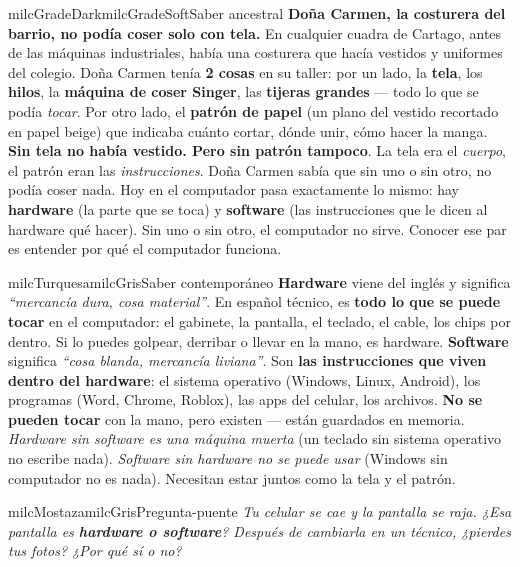 \documentclass[11pt,letterpaper]{article}
\begin{document}
\begin{softbox}{milcGradeDark}{milcGradeSoft}{Saber ancestral}
\textbf{Doña Carmen, la costurera del barrio, no podía coser solo con tela.} En cualquier cuadra de Cartago, antes de las máquinas industriales, había una costurera que hacía vestidos y uniformes del colegio. Doña Carmen tenía \textbf{2 cosas} en su taller: por un lado, la \textbf{tela}, los \textbf{hilos}, la \textbf{máquina de coser Singer}, las \textbf{tijeras grandes} --- todo lo que se podía \emph{tocar}. Por otro lado, el \textbf{patrón de papel} (un plano del vestido recortado en papel beige) que indicaba cuánto cortar, dónde unir, cómo hacer la manga. \textbf{Sin tela no había vestido. Pero sin patrón tampoco}. La tela era el \emph{cuerpo}, el patrón eran las \emph{instrucciones}. Doña Carmen sabía que sin uno o sin otro, no podía coser nada. Hoy en el computador pasa exactamente lo mismo: hay \textbf{hardware} (la parte que se toca) y \textbf{software} (las instrucciones que le dicen al hardware qué hacer). Sin uno o sin otro, el computador no sirve. Conocer ese par es entender por qué el computador funciona.
\end{softbox}

\begin{softbox}{milcTurquesa}{milcGris}{Saber contemporáneo}
\textbf{Hardware} viene del inglés y significa \emph{``mercancía dura, cosa material''}. En español técnico, es \textbf{todo lo que se puede tocar} en el computador: el gabinete, la pantalla, el teclado, el cable, los chips por dentro. Si lo puedes golpear, derribar o llevar en la mano, es hardware. \textbf{Software} significa \emph{``cosa blanda, mercancía liviana''}. Son \textbf{las instrucciones que viven dentro del hardware}: el sistema operativo (Windows, Linux, Android), los programas (Word, Chrome, Roblox), las apps del celular, los archivos. \textbf{No se pueden tocar} con la mano, pero existen --- están guardados en memoria. \emph{Hardware sin software es una máquina muerta} (un teclado sin sistema operativo no escribe nada). \emph{Software sin hardware no se puede usar} (Windows sin computador no es nada). Necesitan estar juntos como la tela y el patrón.
\end{softbox}

\begin{softbox}{milcMostaza}{milcGris}{Pregunta-puente}
\textit{Tu celular se cae y la pantalla se raja. ¿Esa pantalla es \textbf{hardware o software}? Después de cambiarla en un técnico, ¿pierdes tus fotos? ¿Por qué sí o no?}
\end{softbox}
\end{document}
